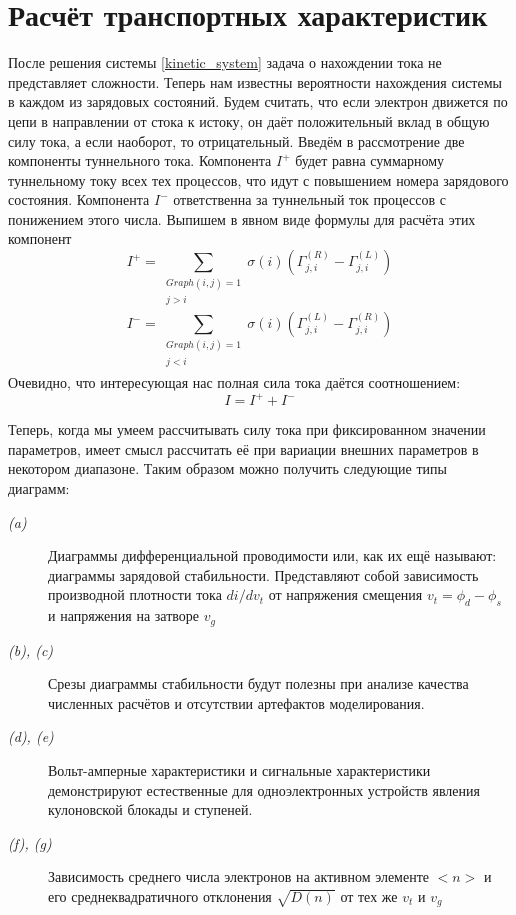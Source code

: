 \documentclass[12pt,a4paper]{report}
\begin{document}
\section{Расчёт транспортных характеристик}
После решения системы \ref{kinetic_system} задача о нахождении тока не представляет сложности. Теперь нам известны вероятности нахождения системы в каждом из зарядовых состояний. Будем считать, что если электрон движется по цепи в направлении от стока к истоку, он даёт положительный вклад в общую силу тока, а если наоборот, то отрицательный. Введём в рассмотрение две компоненты туннельного тока. Компонента $I^+$ будет равна суммарному туннельному току всех тех процессов, что идут с повышением номера зарядового состояния. Компонента $I^-$ ответственна за туннельный ток процессов с понижением этого числа. Выпишем в явном виде формулы для расчёта этих компонент
\begin{equation}\label{i_plus}
I^+ = \sum\limits_{
\begin{array}{c}
Graph(i,j) = 1 \\
 j > i \\
\end{array}
} \sigma(i)(\Gamma_{j,i}^{(R)} - \Gamma_{j,i}^{(L)})
\end{equation}
\begin{equation}\label{i_minus}
I^- = \sum\limits_{
\begin{array}{c}
Graph(i,j) = 1 \\
 j < i \\
\end{array}
} \sigma(i)(\Gamma_{j,i}^{(L)} - \Gamma_{j,i}^{(R)})
\end{equation}
Очевидно, что интересующая нас полная сила тока даётся соотношением:
\begin{equation}\label{i}
I = I^+ + I^-
\end{equation}

Теперь, когда мы умеем рассчитывать силу тока при фиксированном значении параметров, имеет смысл рассчитать её при вариации внешних параметров в некотором диапазоне. Таким образом можно получить следующие типы диаграмм:
\begin{description}

\item[\itshape (a)] Диаграммы дифференциальной проводимости или, как их ещё называют: диаграммы зарядовой стабильности. Представляют собой зависимость производной плотности тока $di/dv_t$ от напряжения смещения $v_t = \phi_d - \phi_s$ и напряжения на затворе $v_g$
\item[\itshape (b), (c)] Срезы диаграммы стабильности будут полезны при анализе качества численных расчётов и отсутствии артефактов моделирования.
\item[\itshape (d), (e)] Вольт-амперные характеристики и сигнальные характеристики демонстрируют естественные для одноэлектронных устройств явления кулоновской блокады и ступеней.
\item[\itshape (f), (g)] Зависимость среднего числа электронов на активном элементе $<n>$ и его среднеквадратичного отклонения $\sqrt{D(n)}$ от тех же $v_t$ и $v_g$
\end{description}
\end{document}
